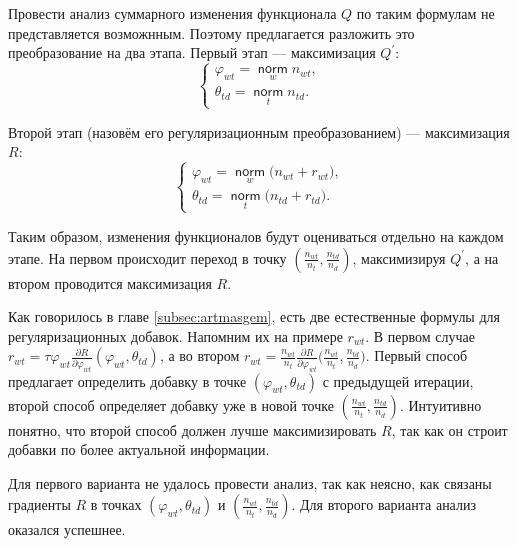 \documentclass[12pt]{article}
\renewcommand{\phi}{\varphi}
\newcommand{\norm}{\mathop{\mathsf{norm}}\limits}
\begin{document}
Провести анализ суммарного изменения функционала $Q$ по таким формулам не представляется возможнным. Поэтому предлагается разложить это преобразование на два этапа. Первый этап --- максимизация $Q^{\prime}$:
\[
\left\{
	\begin{aligned}
		\phi_{wt} = \norm_w  n_{wt},\\
		\theta_{td} = \norm_t n_{td} .
	\end{aligned}
\right.
\]

Второй этап (назовём его регуляризационным преобразованием) --- максимизация $R$:
\[
\left\{
\begin{aligned}
 \phi_{wt}  = \norm_w \bigl(n_{wt} + r_{wt} \bigr),\\
\theta_{td} = \norm_t  \bigl(n_{td} + r_{td}\bigr).
\end{aligned}
\right.
\]

Таким образом, изменения функционалов будут оцениваться  отдельно на каждом этапе. На первом происходит переход в точку $\left(\frac{n_{wt}}{n_t}, \frac{n_{td}}{n_d}\right)$, максимизируя $Q^{\prime}$, а на втором проводится максимизация $R$. 

Как говорилось в главе \ref{subsec:artmasgem}, есть две естественные формулы для регуляризационных добавок. Напомним их на примере $r_{wt}$. В первом случае $r_{wt} = \tau\phi_{wt} \frac{\partial{R}}{\partial{\phi_{wt}}} \left( \phi_{wt}, \theta_{td}\right)$, а во втором $r_{wt} = \frac{n_{wt}}{n_t} \frac{\partial{R}}{\partial{\phi_{wt}}} \big(\frac{n_{wt}}{n_t}, \frac{n_{td}}{n_d}\big)$. Первый способ предлагает определить добавку в точке $(\phi_{wt}, \theta_{td})$ с предыдущей итерации, второй способ определяет добавку уже в новой точке $\left(\frac{n_{wt}}{n_t}, \frac{n_{td}}{n_d}\right)$. Интуитивно понятно, что второй способ  должен лучше максимизировать $R$, так как он строит добавки по более актуальной информации. 

Для первого варианта не удалось провести анализ, так как неясно, как связаны градиенты $R$ в точках $(\phi_{wt}, \theta_{td})$ и $\left(\frac{n_{wt}}{n_t}, \frac{n_{td}}{n_d}\right)$. Для второго варианта анализ оказался успешнее.
\end{document}
